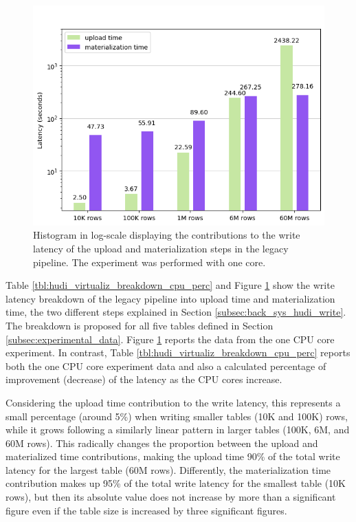 \begin{figure}
\begin{minipage}[b]{\textwidth}
        \includegraphics[width=\textwidth]{figures/5-results/hudi_iceberg_delta/hudi_virtualiz1_core.png}
        \caption[Histogram of the write on legacy pipeline - Time breakdown - 1 core]{Histogram in log-scale displaying the contributions to the write latency of the upload and materialization steps in the legacy pipeline. The experiment was performed with one  core.}
        \label{fig:hudi_virtualiz_breakdown}
    \end{minipage}
\end{figure}

Table \ref{tbl:hudi_virtualiz_breakdown_cpu_perc} and Figure \ref{fig:hudi_virtualiz_breakdown} show the write latency breakdown of the legacy pipeline into upload time and materialization time, the two different steps explained in Section \ref{subsec:back_sys_hudi_write}. The breakdown is proposed for all five tables defined in Section \ref{subsec:experimental_data}. Figure \ref{fig:hudi_virtualiz_breakdown} reports the data from the one \gls{CPU} core experiment. In contrast, Table \ref{tbl:hudi_virtualiz_breakdown_cpu_perc} reports both the one \gls{CPU} core experiment data and also a calculated percentage of improvement (decrease) of the latency as the \gls{CPU} cores increase.

Considering the upload time contribution to the write latency, this represents a small percentage (around 5\%) when writing smaller tables (10K and 100K) rows, while it grows following a similarly linear pattern in larger tables (100K, 6M, and 60M rows). This radically changes the proportion between the upload and materialized time contributions, making the upload time 90\% of the total write latency for the largest table (60M rows). Differently, the materialization time contribution makes up 95\% of the total write latency for the smallest table (10K rows), but then its absolute value does not increase by more than a significant figure even if the table size is increased by three significant figures.

